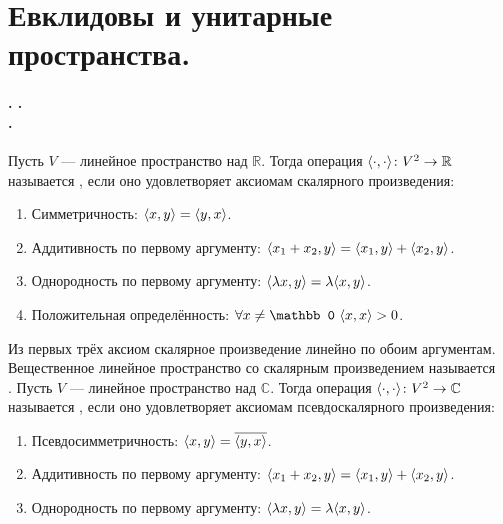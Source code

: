 \documentclass{article}
\let\complexIm\Im
\DeclareMathOperator{\operIm}{Im}
\let\Im\operIm
\begin{document}
    \section{Евклидовы и унитарные пространства.}
    \undef{\Im}
    \let\Im\complexIm
    \paragraph{. .\\.}
    \begin{itemize}
        \dfn Пусть $V$ --- линейное пространство над $\mathbb R$. Тогда операция ${\left\langle{\cdot},{\cdot}\right\rangle}\colon V^2\to\mathbb R$ называется , если оно удовлетворяет аксиомам скалярного произведения:
        \begin{enumerate}
            \item Симметричность: ${\left\langle{x},{y}\right\rangle}={\left\langle{y},{x}\right\rangle}$.
            \item Аддитивность по первому аргументу: ${\left\langle{x_1+x_2},{y}\right\rangle}={\left\langle{x_1},{y}\right\rangle}+{\left\langle{x_2},{y}\right\rangle}$.
            \item Однородность по первому аргументу: ${\left\langle{\lambda x},{y}\right\rangle}=\lambda{\left\langle{x},{y}\right\rangle}$.
            \item Положительная определённость: $\forall x\neq\mathbb0~\dotprod{x}{x}>0$.
        \end{enumerate}
        \thm Из первых трёх аксиом скалярное произведение линейно по обоим аргументам.
        \dfn Вещественное линейное пространство со скалярным произведением называется\\
        .
        \dfn Пусть $V$ --- линейное пространство над $\mathbb C$. Тогда операция ${\left\langle{\cdot},{\cdot}\right\rangle}\colon V^2\to\mathbb C$ называется , если оно удовлетворяет аксиомам псевдоскалярного произведения:
        \begin{enumerate}
            \item Псевдосимметричность: ${\left\langle{x},{y}\right\rangle}=\overline{{\left\langle{y},{x}\right\rangle}}$.
            \item Аддитивность по первому аргументу: ${\left\langle{x_1+x_2},{y}\right\rangle}={\left\langle{x_1},{y}\right\rangle}+{\left\langle{x_2},{y}\right\rangle}$.
            \item Однородность по первому аргументу: ${\left\langle{\lambda x},{y}\right\rangle}=\lambda{\left\langle{x},{y}\right\rangle}$.

\end{enumerate}
\end{itemize}
\end{document}
